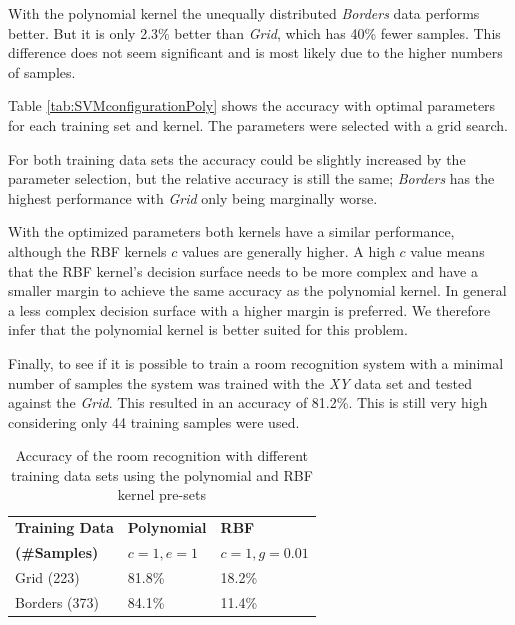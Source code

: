 With the polynomial kernel the unequally distributed \emph{Borders} data performs better. But it is only 2.3\% better than \emph{Grid}, which has 40\% fewer samples. This difference does not seem significant and is most likely due to the higher numbers of samples.

Table \ref{tab:SVMconfigurationPoly} shows the accuracy with optimal parameters for each training set and kernel. The parameters were selected with a grid search.

For both training data sets the accuracy could be slightly increased by the parameter selection, but the relative accuracy is still the same; \emph{Borders} has the highest performance with \emph{Grid} only being marginally worse.

With the optimized parameters both kernels have a similar performance, although the RBF kernels $c$ values are generally higher. A high $c$ value means that the RBF kernel's decision surface needs to be more complex and have a smaller margin to achieve the same accuracy as the polynomial kernel. In general a less complex decision surface with a higher margin is preferred. We therefore infer that the polynomial kernel is better suited for this problem.

Finally, to see if it is possible to train a room recognition system with a minimal number of samples the system was trained with the \emph{XY} data set and tested against the \emph{Grid}. This resulted in an accuracy of 81.2\%. This is still very high considering only 44 training samples were used.



\begin{table}

\centering
\begin{tabular}{l l l}
\toprule
\textbf{Training Data}&\textbf{Polynomial}&\textbf{RBF}\\
\textbf{(\#Samples)}&$c=1,e=1$&$c=1,g=0.01$\\
\midrule
Grid (223)&81.8\%&18.2\%\\
Borders (373)&84.1\%&11.4\%\\
\bottomrule
\end{tabular}
\caption[Room recognition - SVM pre-sets]{Accuracy of the room recognition with different training data sets using the polynomial and RBF kernel pre-sets}
\label{tab:SVMconfigurationPresets}
\end{table}

